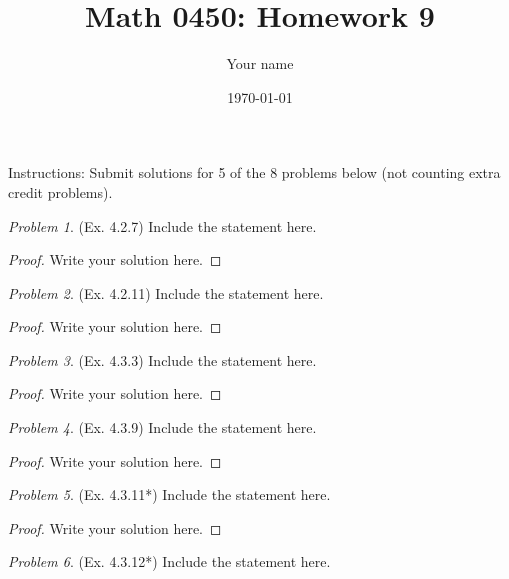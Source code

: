 \documentclass[11pt,twoside, reqno]{amsart}
\theoremstyle{remark}
\newtheorem{Prob}{Problem}
\begin{document}
\title{Math 0450: Homework 9}
\date{\today}
\author{Your name}

\maketitle
Instructions: Submit solutions for 5 of the 8 problems below (not counting extra credit problems).

\begin{Prob}(Ex. 4.2.7) Include the statement here.


\end{Prob}

\begin{proof}
Write your solution here.

\end{proof}

\begin{Prob}(Ex. 4.2.11)  Include the statement here.


\end{Prob}

\begin{proof}
Write your solution here.

\end{proof}

\begin{Prob}(Ex. 4.3.3)  Include the statement here.
\end{Prob}

\begin{proof}
Write your solution here.

\end{proof}


\begin{Prob}(Ex. 4.3.9)  Include the statement here.
\end{Prob}

\begin{proof}
Write your solution here.

\end{proof}


\begin{Prob}(Ex. 4.3.11*)  Include the statement here.
\end{Prob}

\begin{proof}
Write your solution here.

\end{proof}

\begin{Prob}(Ex. 4.3.12*)  Include the statement here.
\end{Prob}
\end{document}
